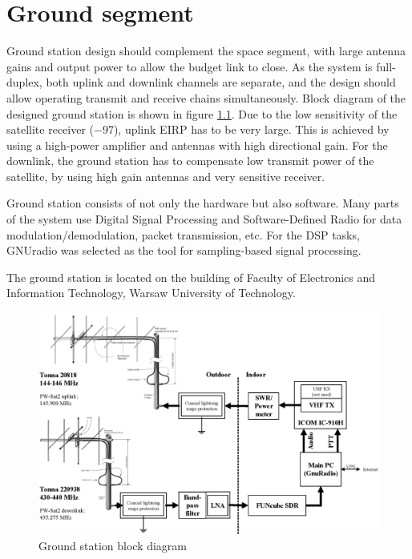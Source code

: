 \chapter{Ground segment}
Ground station design should complement the space segment, with large antenna gains and output power to allow the budget link to close. As the system is full-duplex, both uplink and downlink channels are separate, and the design should allow operating transmit and receive chains simultaneously. Block diagram of the designed ground station is shown in figure \ref{gs_block_diagram}.
Due to the low sensitivity of the satellite receiver (\SI{-97}{\dBm}), uplink EIRP has to be very large. This is achieved by using a high-power amplifier and antennas with high directional gain. For the downlink, the ground station has to compensate low transmit power of the satellite, by using high gain antennas and very sensitive receiver.

Ground station consists of not only the hardware but also software. Many parts of the system use Digital Signal Processing and Software-Defined Radio for data modulation/demodulation, packet transmission, etc. For the DSP tasks, GNUradio \cite{gnuradio} was selected as the tool for sampling-based signal processing.

The ground station is located on the building of Faculty of Electronics and Information Technology, Warsaw University of Technology.

\begin{figure}[H]
    \centering
    \includegraphics[width=0.7\paperwidth]{img/7/gs_block_diagram.eps}
    \caption{Ground station block diagram}
    \label{gs_block_diagram}
\end{figure}


